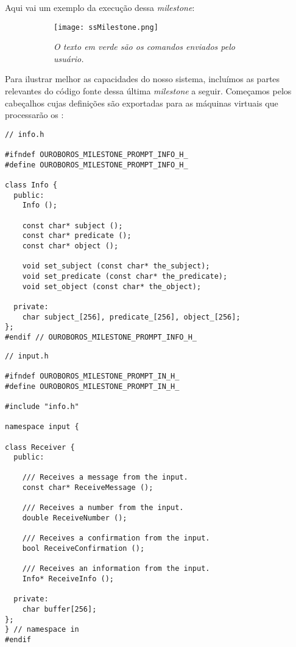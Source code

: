 Aqui vai um exemplo da execução dessa \textit{milestone}:

\begin{figure}[ht]
      \centering
      \caption{}
      \begin{subfigure}{.8\textwidth}
        \begin{center}
          \texttt{[image: ssMilestone.png]}
          \vspace{1em}

          \textit{
            O texto em verde são os comandos enviados pelo usuário.
          }
        \end{center}
      \end{subfigure}
      \label{fig:milestone}
    \end{figure}

Para ilustrar melhor as capacidades do nosso sistema, incluímos as
partes relevantes do código fonte dessa última \textit{milestone}
a seguir. Começamos pelos cabeçalhos cujas definições são exportadas
para as máquinas virtuais que processarão os :

\vspace{1em}
\begin{lstlisting}
// info.h

#ifndef OUROBOROS_MILESTONE_PROMPT_INFO_H_
#define OUROBOROS_MILESTONE_PROMPT_INFO_H_

class Info {
  public:
    Info ();

    const char* subject ();
    const char* predicate ();
    const char* object ();

    void set_subject (const char* the_subject);
    void set_predicate (const char* the_predicate);
    void set_object (const char* the_object);

  private:
    char subject_[256], predicate_[256], object_[256];
};
#endif // OUROBOROS_MILESTONE_PROMPT_INFO_H_
\end{lstlisting}
\vspace{1em}
\begin{lstlisting}
// input.h  

#ifndef OUROBOROS_MILESTONE_PROMPT_IN_H_
#define OUROBOROS_MILESTONE_PROMPT_IN_H_

#include "info.h"

namespace input {

class Receiver {
  public:

    /// Receives a message from the input.
    const char* ReceiveMessage ();
    
    /// Receives a number from the input.
    double ReceiveNumber ();
    
    /// Receives a confirmation from the input.
    bool ReceiveConfirmation ();

    /// Receives an information from the input.
    Info* ReceiveInfo ();

  private:
    char buffer[256];
};
} // namespace in
#endif
\end{lstlisting}


